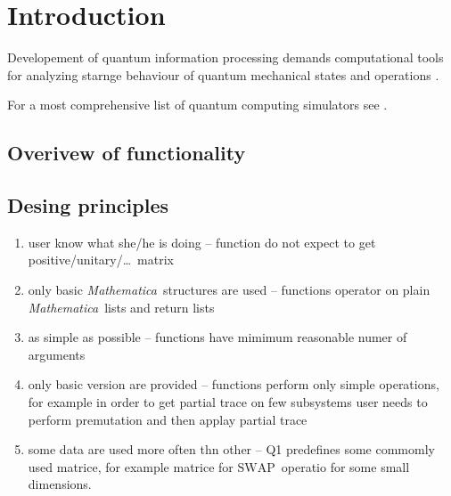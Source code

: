 \documentclass[final,5p,times,twocolumn]{elsarticle}
\newcommand{\Mathematica}{\emph{Mathematica}}
\newcommand{\1}{{\rm 1\hspace{-0.9mm}l}}
\newcommand{\SWAP}{\ensuremath{\mathrm{SWAP}}}
\begin{document}

\section{Introduction}\label{sec:intro}

Developement of quantum information processing demands computational tools 
for analyzing starnge behaviour of quantum mechanical states and operations \cite{qdensity,radtke08simulation}.

For a most comprehensive list of quantum computing simulators see \cite{quantiki}.


\subsection{Overivew of functionality}


\subsection{Desing principles}

\begin{enumerate}
\item user know what she/he is doing -- function do not expect to get positive/unitary/\ldots\
matrix
\item only basic \Mathematica\ structures are used -- functions operator on 
plain \Mathematica\ lists and return lists
\item as simple as possible -- functions have mimimum reasonable numer of arguments
\item only basic version are provided -- functions perform only simple 
operations, for example in order to get partial trace on few subsystems user
needs to perform premutation and then applay partial trace
\item some data are used more often thn other -- Q1 predefines some commomly used
matrice, for example matrice for \SWAP\ operatio for some small dimensions.
\end{enumerate}
\end{document}
